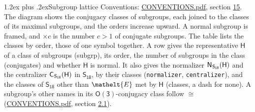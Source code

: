 \documentclass[10pt,a4paper]{article}
\makeatletter
\renewcommand\section{\@startsection{section}{1}{\z@}{-3ex plus -1ex minus -.2ex}%
  {1.2ex plus .2ex}{\normalfont\large\sffamily\bfseries\color{parttitle}}}
\numberwithin{equation}{section}
\newcommand{\eltfont}[1]{{\let\sigma\eltsigma\mathelt{#1}}}
\newcommand{\grp}[1]{\mathsf{#1}}
\newcommand{\cls}[1]{\eltfont{#1}}
\newcommand{\samecls}{\cong}
\newcommand{\hairsp}{\mkern1mu}
\makeatother
\begin{document}
\section{Subgroup lattice}\label{s:subgroups}
Conventions: \href{../../CONVENTIONS.pdf}{CONVENTIONS.pdf}, section \href{../../CONVENTIONS.pdf\#conv.15}{15}.
The diagram shows the conjugacy classes of subgroups, each joined to the classes of its maximal subgroups, and the orders increase upward. \label{n:index.conjugates.c}A normal subgroup is framed, and ${\times}c$ is the number $c > 1$ of conjugate subgroups. The table lists the classes by order, those of one symbol together. \label{n:group.H}\label{n:head.subgroup}\label{n:head.order}\label{n:head.conjugates}\label{n:head.normal}A row gives the representative $\grp{H}$ of a class of subgroups (subgrp), its order, the number of subgroups in the class (conjugates) and whether $\grp{H}$ is normal. \label{n:group.normalizer}\label{n:group.centralizer}\label{n:head.classes}It also gives the normalizer $\grp{N}_{\hairsp \grp{S_{18}}}(\grp{H})$ and the centralizer $\grp{C}_{\hairsp \grp{S_{18}}}(\grp{H})$ in $\grp{S_{18}}$, by their classes (\texttt{normalizer}, \texttt{centralizer}), and the classes of $\grp{S_{18}}$ other than $\cls{E}$ met by $\grp{H}$ (classes, a dash for none). A subgroup's other names in its \href{O3.pdf}{$\grp{O(3)}$}-conjugacy class follow $\samecls$ (\href{../../CONVENTIONS.pdf}{CONVENTIONS.pdf}, section \href{../../CONVENTIONS.pdf\#conv.2.1}{2.1}).
\begin{center}
\end{center}
\end{document}
